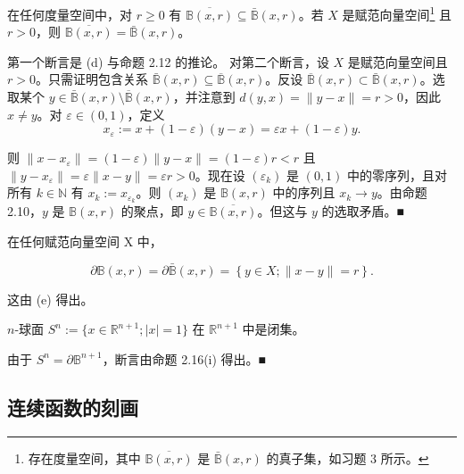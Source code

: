 \begin{example}
\begin{items}
在任何度量空间中，对 $ r \geq 0 $ 有 $ \overline{\mathbb{B}(x,r)} \subseteq \bar{\mathbb{B}}(x,r) $。若 $ X $ 是赋范向量空间\footnote{存在度量空间，其中 $ \overline{\mathbb{B}(x,r)} $ 是 $ \bar{\mathbb{B}}(x,r) $ 的真子集，如习题 3 所示。} 且 $ r > 0 $，则 $ \overline{\mathbb{B}(x,r)} = \bar{\mathbb{B}}(x,r) $。

\proofhead
第一个断言是 (d) 与命题 2.12 的推论。
对第二个断言，设 $X$ 是赋范向量空间且 $r > 0$。只需证明包含关系 $\bar{\mathbb{B}}(x, r) \subseteq \overline{\mathbb{B}}(x, r)$。反设 $\overline{\mathbb{B}}(x, r) \subset \bar{\mathbb{B}}(x, r)$。选取某个 $y \in \bar{\mathbb{B}}(x, r) \setminus \overline{\mathbb{B}}(x, r)$，并注意到 $d(y, x) = \|y - x\| = r > 0$，因此 $x \neq y$。对 $\varepsilon \in (0, 1)$，定义
\[
x_{\varepsilon}:=x+(1-\varepsilon)(y-x)=\varepsilon x+(1-\varepsilon)y.
\]

则 $ \|x - x_\varepsilon\| = (1 - \varepsilon) \|y - x\| = (1 - \varepsilon) r < r $ 且 $ \|y - x_\varepsilon\| = \varepsilon \|x - y\| = \varepsilon r > 0 $。现在设 $ (\varepsilon_k) $ 是 $ (0,1) $ 中的零序列，且对所有 $ k \in \mathbb{N} $ 有 $ x_k := x_{\varepsilon_k} $。则 $ (x_k) $ 是 $ \mathbb{B}(x, r) $ 中的序列且 $ x_k \to y $。由命题 2.10，$ y $ 是 $ \mathbb{B}(x, r) $ 的聚点，即 $ y \in \overline{\mathbb{B}(x, r)} $。但这与 $ y $ 的选取矛盾。■

\end{items}


\begin{items}
\item[（f）]

在任何赋范向量空间 X 中，

\[
\partial\mathbb{B}(x,r)=\partial\bar{\mathbb{B}}(x,r)=\left\{y\in X;\|x-y\|=r\right\}.
\]

\proofhead
这由 (e) 得出。
\item[（g）]

$ n $-球面 $ S^n := \{x \in \mathbb{R}^{n+1} ; |x| = 1\} $ 在 $ \mathbb{R}^{n+1} $ 中是闭集。

\proofhead
由于 $ S^n = \partial \mathbb{B}^{n+1} $，断言由命题 2.16(i) 得出。■
\end{items}

\end{example}

\subsection*{连续函数的刻画}

